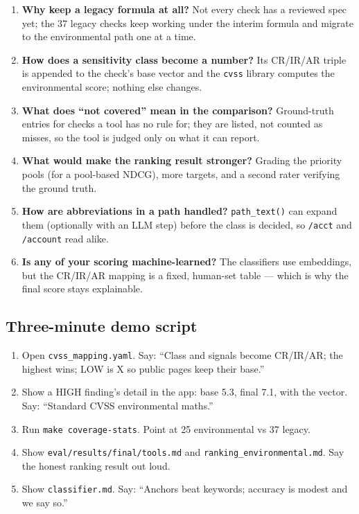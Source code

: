 \begin{enumerate}[leftmargin=*,itemsep=3pt]
well-known, intentionally vulnerable apps that between them cover web pages and
REST APIs, so the ground truth can be written with confidence.
\item \textbf{Why keep a legacy formula at all?} Not every check has a reviewed
spec yet; the 37 legacy checks keep working under the interim formula and migrate
to the environmental path one at a time.
\item \textbf{How does a sensitivity class become a number?} Its CR/IR/AR triple
is appended to the check's base vector and the \texttt{cvss} library computes the
environmental score; nothing else changes.
\item \textbf{What does ``not covered'' mean in the comparison?} Ground-truth
entries for checks a tool has no rule for; they are listed, not counted as misses,
so the tool is judged only on what it can report.
\item \textbf{What would make the ranking result stronger?} Grading the priority
pools (for a pool-based NDCG), more targets, and a second rater verifying the
ground truth.
\item \textbf{How are abbreviations in a path handled?} \texttt{path\_text()} can
expand them (optionally with an LLM step) before the class is decided, so
\texttt{/acct} and \texttt{/account} read alike.
\item \textbf{Is any of your scoring machine-learned?} The classifiers use
embeddings, but the CR/IR/AR mapping is a fixed, human-set table --- which is why
the final score stays explainable.
\end{enumerate}

\subsection{Three-minute demo script}
\begin{enumerate}[leftmargin=*]
\item Open \texttt{cvss\_mapping.yaml}. Say: ``Class and signals become CR/IR/AR;
the highest wins; LOW is X so public pages keep their base.''
\item Show a HIGH finding's detail in the app: base 5.3, final 7.1, with the
vector. Say: ``Standard CVSS environmental maths.''
\item Run \texttt{make coverage-stats}. Point at 25 environmental vs 37 legacy.
\item Show \texttt{eval/results/final/tools.md} and \texttt{ranking\_environmental.md}.
Say the honest ranking result out loud.
\item Show \texttt{classifier.md}. Say: ``Anchors beat keywords; accuracy is
modest and we say so.''
\end{enumerate}

